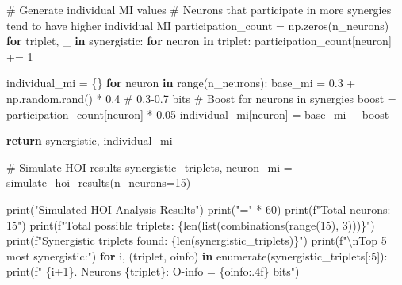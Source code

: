 \documentclass[
  11pt,
  letterpaper,
  oneside,
  openany]{book}
\newenvironment{Shaded}{\begin{snugshade}}{\end{snugshade}}
\newcommand{\BuiltInTok}[1]{\textcolor[rgb]{0.00,0.23,0.31}{#1}}
\newcommand{\CharTok}[1]{\textcolor[rgb]{0.13,0.47,0.30}{#1}}
\newcommand{\CommentTok}[1]{\textcolor[rgb]{0.37,0.37,0.37}{#1}}
\newcommand{\ControlFlowTok}[1]{\textcolor[rgb]{0.00,0.23,0.31}{\textbf{#1}}}
\newcommand{\DecValTok}[1]{\textcolor[rgb]{0.68,0.00,0.00}{#1}}
\newcommand{\FloatTok}[1]{\textcolor[rgb]{0.68,0.00,0.00}{#1}}
\newcommand{\KeywordTok}[1]{\textcolor[rgb]{0.00,0.23,0.31}{\textbf{#1}}}
\newcommand{\NormalTok}[1]{\textcolor[rgb]{0.00,0.23,0.31}{#1}}
\newcommand{\OperatorTok}[1]{\textcolor[rgb]{0.37,0.37,0.37}{#1}}
\newcommand{\SpecialCharTok}[1]{\textcolor[rgb]{0.37,0.37,0.37}{#1}}
\newcommand{\SpecialStringTok}[1]{\textcolor[rgb]{0.13,0.47,0.30}{#1}}
\newcommand{\StringTok}[1]{\textcolor[rgb]{0.13,0.47,0.30}{#1}}
\begin{document}
\begin{Shaded}
\begin{Highlighting}[]
    \CommentTok{\# Generate individual MI values}
    \CommentTok{\# Neurons that participate in more synergies tend to have higher individual MI}
\NormalTok{    participation\_count }\OperatorTok{=}\NormalTok{ np.zeros(n\_neurons)}
    \ControlFlowTok{for}\NormalTok{ triplet, \_ }\KeywordTok{in}\NormalTok{ synergistic:}
        \ControlFlowTok{for}\NormalTok{ neuron }\KeywordTok{in}\NormalTok{ triplet:}
\NormalTok{            participation\_count[neuron] }\OperatorTok{+=} \DecValTok{1}
    
\NormalTok{    individual\_mi }\OperatorTok{=}\NormalTok{ \{\}}
    \ControlFlowTok{for}\NormalTok{ neuron }\KeywordTok{in} \BuiltInTok{range}\NormalTok{(n\_neurons):}
\NormalTok{        base\_mi }\OperatorTok{=} \FloatTok{0.3} \OperatorTok{+}\NormalTok{ np.random.rand() }\OperatorTok{*} \FloatTok{0.4}  \CommentTok{\# 0.3{-}0.7 bits}
        \CommentTok{\# Boost for neurons in synergies}
\NormalTok{        boost }\OperatorTok{=}\NormalTok{ participation\_count[neuron] }\OperatorTok{*} \FloatTok{0.05}
\NormalTok{        individual\_mi[neuron] }\OperatorTok{=}\NormalTok{ base\_mi }\OperatorTok{+}\NormalTok{ boost}
    
    \ControlFlowTok{return}\NormalTok{ synergistic, individual\_mi}

\CommentTok{\# Simulate HOI results}
\NormalTok{synergistic\_triplets, neuron\_mi }\OperatorTok{=}\NormalTok{ simulate\_hoi\_results(n\_neurons}\OperatorTok{=}\DecValTok{15}\NormalTok{)}

\BuiltInTok{print}\NormalTok{(}\StringTok{"Simulated HOI Analysis Results"}\NormalTok{)}
\BuiltInTok{print}\NormalTok{(}\StringTok{"="} \OperatorTok{*} \DecValTok{60}\NormalTok{)}
\BuiltInTok{print}\NormalTok{(}\SpecialStringTok{f"Total neurons: 15"}\NormalTok{)}
\BuiltInTok{print}\NormalTok{(}\SpecialStringTok{f"Total possible triplets: }\SpecialCharTok{\{}\BuiltInTok{len}\NormalTok{(}\BuiltInTok{list}\NormalTok{(combinations(}\BuiltInTok{range}\NormalTok{(}\DecValTok{15}\NormalTok{), }\DecValTok{3}\NormalTok{)))}\SpecialCharTok{\}}\SpecialStringTok{"}\NormalTok{)}
\BuiltInTok{print}\NormalTok{(}\SpecialStringTok{f"Synergistic triplets found: }\SpecialCharTok{\{}\BuiltInTok{len}\NormalTok{(synergistic\_triplets)}\SpecialCharTok{\}}\SpecialStringTok{"}\NormalTok{)}
\BuiltInTok{print}\NormalTok{(}\SpecialStringTok{f"}\CharTok{\textbackslash{}n}\SpecialStringTok{Top 5 most synergistic:"}\NormalTok{)}
\ControlFlowTok{for}\NormalTok{ i, (triplet, oinfo) }\KeywordTok{in} \BuiltInTok{enumerate}\NormalTok{(synergistic\_triplets[:}\DecValTok{5}\NormalTok{]):}
    \BuiltInTok{print}\NormalTok{(}\SpecialStringTok{f"  }\SpecialCharTok{\{}\NormalTok{i}\OperatorTok{+}\DecValTok{1}\SpecialCharTok{\}}\SpecialStringTok{. Neurons }\SpecialCharTok{\{}\NormalTok{triplet}\SpecialCharTok{\}}\SpecialStringTok{: O{-}info = }\SpecialCharTok{\{}\NormalTok{oinfo}\SpecialCharTok{:.4f\}}\SpecialStringTok{ bits"}\NormalTok{)}


\end{Highlighting}
\end{Shaded}
\end{document}
